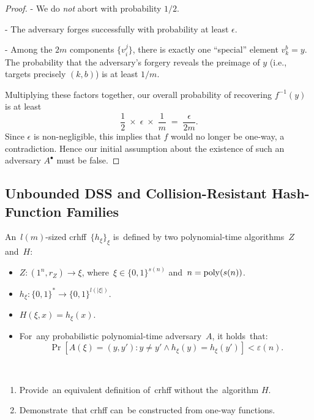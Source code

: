 \begin{proof}
  - We do \emph{not} abort with probability \(1/2\).

  - The adversary forges successfully with probability at least \(\epsilon\).

  - Among the \(2m\) components \(\{v_{i}^j\}\), there is exactly one “special” element \(v_{k}^{b} = y\). The probability that the adversary’s forgery reveals the preimage of \(y\) (i.e., targets precisely \((k,b)\)) is at least \(1/m\).

  Multiplying these factors together, our overall probability of recovering \(f^{-1}(y)\) is at least
  \[
    \frac{1}{2} \;\times\; \epsilon \;\times\; \frac{1}{m} 
    \;=\; \frac{\epsilon}{2m}.
  \]
  Since \(\epsilon\) is non-negligible, this implies that \(f\) would no longer be one-way, a contradiction. Hence our initial assumption about the existence of such an adversary \(A^\bullet\) must be false.
\end{proof}

\subsection{Unbounded DSS and Collision-Resistant Hash-Function Families}

\begin{definition}
    An~$l(m)$-sized crhff~$\{h_{\xi}\}_{\xi}$ is~defined by two polynomial-time algorithms~$Z$ and~$H$:
    \begin{itemize}
        \item $Z \colon (1^{n}, r_Z) \to \xi$, where~$\xi \in \{0, 1\}^{s(n)}$ and~$n = \operatorname{poly}(s(n))$.
        \item $h_{\xi} \colon \{0, 1\}^{*} \to \{0, 1\}^{l(|\xi|)}$.
        \item $H(\xi, x) = h_\xi(x)$.
        \item For~any probabilistic polynomial-time adversary~$A$, it holds~that:
            \[
                \Pr\left[A(\xi) = (y, y') \colon y \neq y' \wedge h_{\xi}(y) = h_{\xi}(y')\right] < \varepsilon(n).
            \]
    \end{itemize}
\end{definition}

\begin{exercise} ~
    \begin{enumerate}
        \item Provide~an equivalent definition of~crhff without the~algorithm $H$.
        \item Demonstrate~that crhff can~be constructed from one-way functions.
    \end{enumerate}
\end{exercise}

